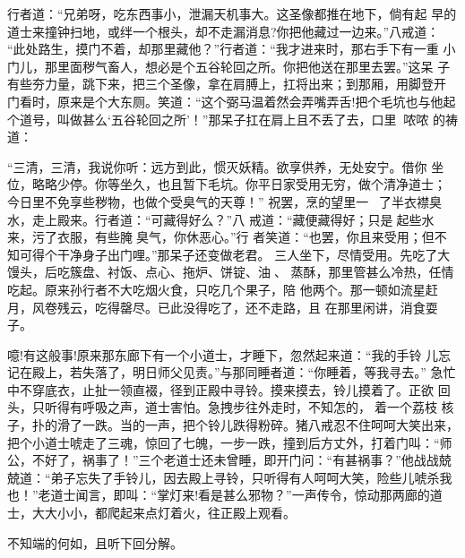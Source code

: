 行者道：“兄弟呀，吃东西事小，泄漏天机事大。这圣像都推在地下，倘有起
早的道士来撞钟扫地，或绊一个根头，却不走漏消息?你把他藏过一边来。”八戒道：
“此处路生，摸门不着，却那里藏他？”行者道：“我才进来时，那右手下有一重
小门儿，那里面秽气畜人，想必是个五谷轮回之所。你把他送在那里去罢。”这呆
子有些夯力量，跳下来，把三个圣像，拿在肩膊上，扛将出来；到那厢，用脚登开
门看时，原来是个大东厕。笑道：“这个弼马温着然会弄嘴弄舌!把个毛坑也与他起
个道号，叫做甚么‘五谷轮回之所’！”那呆子扛在肩上且不丢了去，口里哝哝
的祷道：

“三清，三清，我说你听：远方到此，惯灭妖精。欲享供养，无处安宁。借你
坐位，略略少停。你等坐久，也且暂下毛坑。你平日家受用无穷，做个清净道士；
今日里不免享些秽物，也做个受臭气的天尊！”
祝罢，烹的望里一，了半衣襟臭水，走上殿来。行者道：“可藏得好么？”八
戒道：“藏便藏得好；只是起些水来，污了衣服，有些腌臭气，你休恶心。”行
者笑道：“也罢，你且来受用；但不知可得个干净身子出门哩。”那呆子还变做老君。
三人坐下，尽情受用。先吃了大馒头，后吃簇盘、衬饭、点心、拖炉、饼锭、油、
蒸酥，那里管甚么冷热，任情吃起。原来孙行者不大吃烟火食，只吃几个果子，陪
他两个。那一顿如流星赶月，风卷残云，吃得罄尽。已此没得吃了，还不走路，且
在那里闲讲，消食耍子。

噫!有这般事!原来那东廊下有一个小道士，才睡下，忽然起来道：“我的手铃
儿忘记在殿上，若失落了，明日师父见责。”与那同睡者道：“你睡着，等我寻去。”
急忙中不穿底衣，止扯一领直裰，径到正殿中寻铃。摸来摸去，铃儿摸着了。正欲
回头，只听得有呼吸之声，道士害怕。急拽步往外走时，不知怎的，着一个荔枝
核子，扑的滑了一跌。当的一声，把个铃儿跌得粉碎。猪八戒忍不住呵呵大笑出来，
把个小道士唬走了三魂，惊回了七魄，一步一跌，撞到后方丈外，打着门叫：“师
公，不好了，祸事了！”三个老道士还未曾睡，即开门问：“有甚祸事？”他战战兢
兢道：“弟子忘失了手铃儿，因去殿上寻铃，只听得有人呵呵大笑，险些儿唬杀我
也！”老道士闻言，即叫：“掌灯来!看是甚么邪物？”一声传令，惊动那两廊的道
士，大大小小，都爬起来点灯着火，往正殿上观看。

不知端的何如，且听下回分解。